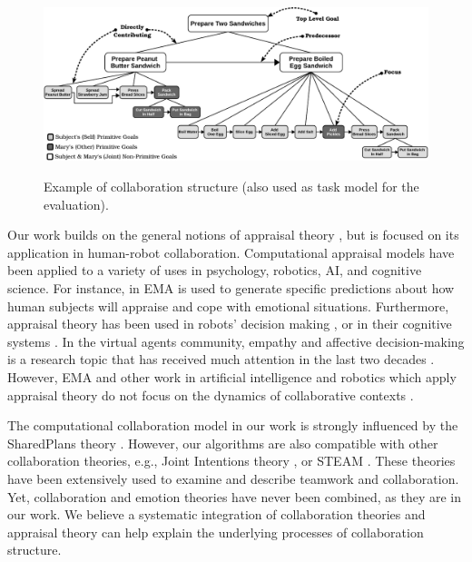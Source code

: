 \documentclass{aamas2016_extendedabstract}
\begin{document}
\begin{figure}
  \centering
  \vspace*{-5mm}
  \includegraphics[width=14.5cm,height=5.225cm]{figure/taskModel-croped.pdf}
  \vspace*{-3mm}
  \caption{Example of collaboration structure (also used as task model for
  the evaluation).}
  \label{fig:taskModel}
  \vspace*{-5mm}
\end{figure}

Our work builds on the general notions of appraisal theory
\cite{gratch:domain-independent,marsella:computational,scherer:sequential-appraisal-process,scherer:appraisal-processes},
but is focused on its application in human-robot collaboration. Computational
appraisal models have been applied to a variety of uses in psychology, robotics,
AI, and cognitive science. For instance, in \cite{marsella:ema-process-model}
EMA is used to generate specific predictions about how human subjects will
appraise and cope with emotional situations. Furthermore, appraisal theory has
been used in robots' decision making \cite{castro:autonomous-robot-fear}, or in
their cognitive systems
\cite{hudlicka:emotinos-reasons,marinier:emotion-reinforcement}. In the virtual
agents community, empathy and affective decision-making is a research topic that
has received much attention in the last two decades
\cite{scott:modeling-empathy-agent,paiva:agent-care,pontier:women-robot-men,velasquez:emotions-motivations-agents}.
However, EMA and other work in artificial intelligence and robotics which apply
appraisal theory do not focus on the dynamics of collaborative contexts
\cite{adam:bdi-emotional-companion,kim:model-hri-appraisal,marsella:ema-process-model,rosenbloom:sigma-appraisal}.

The computational collaboration model in our work is strongly influenced by the
SharedPlans theory \cite{grosz:plans-discourse}. However, our algorithms are
also compatible with other collaboration theories, e.g., Joint Intentions theory
\cite{cohen:teamwork}, or STEAM \cite{tambe:flexible-teamwork}. These theories
have been extensively used to examine and describe teamwork and collaboration.
Yet, collaboration and emotion theories have never been combined, as they are in
our work. We believe a systematic integration of collaboration theories and
appraisal theory can help explain the underlying processes of collaboration
structure.
\end{document}
